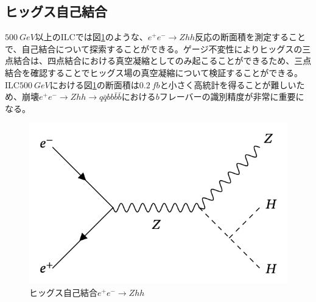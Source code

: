 \subsection{ヒッグス自己結合}
$\SI{500}{GeV}$以上のILCでは図\ref{selfcoupling}のような、$e^+e^- \rightarrow Zhh$反応の断面積を測定することで、自己結合について探索することができる。ゲージ不変性によりヒッグスの三点結合は、四点結合における真空凝縮としてのみ起こることができるため、三点結合を確認することでヒッグス場の真空凝縮について検証することができる。ILC$\SI{500}{GeV}$における図\ref{selfcoupling}の断面積は$\SI{0.2}{fb}$と小さく高統計を得ることが難しいため、崩壊$e^+e^- \rightarrow Zhh \rightarrow q\bar{q}bb\bar{b}\bar{b}$における$b$フレーバーの識別精度が非常に重要になる。
\begin{figure}[h]
	\begin{center}
 \includegraphics[keepaspectratio, scale=0.3]
 	{Figure/Introduction/selfcoupling.png}
 		\caption{ヒッグス自己結合$e^+e^- \rightarrow Zhh$}
 		\label{selfcoupling}
	\end{center}
\end{figure}
